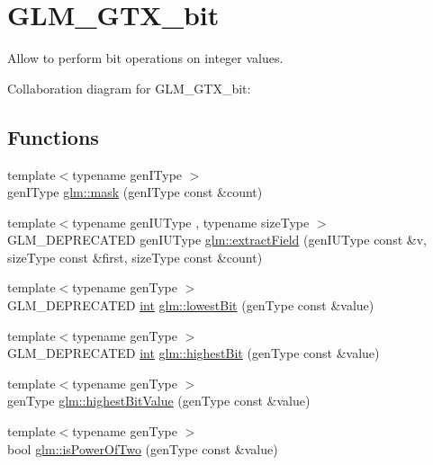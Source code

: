 \hypertarget{group__gtx__bit}{}\section{G\+L\+M\+\_\+\+G\+T\+X\+\_\+bit}
\label{group__gtx__bit}


Allow to perform bit operations on integer values.  


Collaboration diagram for G\+L\+M\+\_\+\+G\+T\+X\+\_\+bit\+:
\subsection*{Functions}
\begin{DoxyCompactItemize}
\item 
{\footnotesize template$<$typename gen\+I\+Type $>$ }\\gen\+I\+Type \hyperlink{group__gtx__bit_ga0d044f92de0108409d25ebcfea034dcb}{glm\+::mask} (gen\+I\+Type const \&count)
\item 
{\footnotesize template$<$typename gen\+I\+U\+Type , typename size\+Type $>$ }\\G\+L\+M\+\_\+\+D\+E\+P\+R\+E\+C\+A\+T\+E\+D gen\+I\+U\+Type \hyperlink{group__gtx__bit_gaff795f058953fb7369dbca274291f2fe}{glm\+::extract\+Field} (gen\+I\+U\+Type const \&v, size\+Type const \&first, size\+Type const \&count)
\item 
{\footnotesize template$<$typename gen\+Type $>$ }\\G\+L\+M\+\_\+\+D\+E\+P\+R\+E\+C\+A\+T\+E\+D \hyperlink{_s_d_l__thread_8h_a6a64f9be4433e4de6e2f2f548cf3c08e}{int} \hyperlink{group__gtx__bit_ga760038264d7d0c0e87f05849c8c158cc}{glm\+::lowest\+Bit} (gen\+Type const \&value)
\item 
{\footnotesize template$<$typename gen\+Type $>$ }\\G\+L\+M\+\_\+\+D\+E\+P\+R\+E\+C\+A\+T\+E\+D \hyperlink{_s_d_l__thread_8h_a6a64f9be4433e4de6e2f2f548cf3c08e}{int} \hyperlink{group__gtx__bit_ga01e02cdbfd0f7487fa800942ac911801}{glm\+::highest\+Bit} (gen\+Type const \&value)
\item 
{\footnotesize template$<$typename gen\+Type $>$ }\\gen\+Type \hyperlink{group__gtx__bit_ga485d3ead7f6c624b00cc800c68ab8e08}{glm\+::highest\+Bit\+Value} (gen\+Type const \&value)
\item 
{\footnotesize template$<$typename gen\+Type $>$ }\\bool \hyperlink{group__gtx__bit_ga3c0b3e843fa21220f08e801bb558470a}{glm\+::is\+Power\+Of\+Two} (gen\+Type const \&value)

\end{DoxyCompactItemize}
